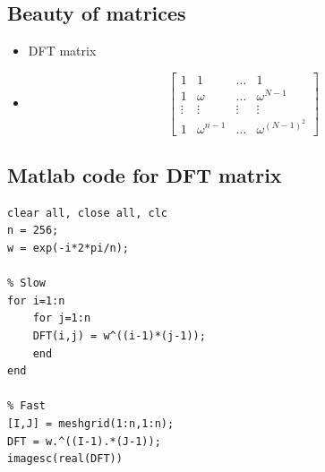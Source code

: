 \documentclass[11pt]{article}
\begin{document}
\subsection{Beauty of matrices}
\label{sec:org66e5bbc}
\begin{itemize}
\item DFT matrix
\item \[ \begin{bmatrix} 1 & 1 & \ldots & 1 \\ 1 & \omega & \ldots & \omega^{N-1} \\ \vdots & \vdots & \vdots & \vdots \\ 1 & \omega^{n-1} & \ldots & \omega^{(N-1)^2} \end{bmatrix} \]
\end{itemize}
\subsection{Matlab code for DFT matrix}
\label{sec:org84ceb14}
\begin{verbatim}
clear all, close all, clc
n = 256;
w = exp(-i*2*pi/n);

% Slow
for i=1:n
    for j=1:n
	DFT(i,j) = w^((i-1)*(j-1));
    end
end

% Fast
[I,J] = meshgrid(1:n,1:n);
DFT = w.^((I-1).*(J-1));
imagesc(real(DFT))

\end{verbatim}
\end{document}
